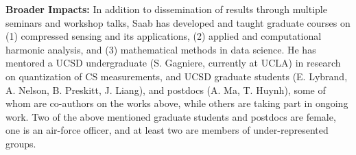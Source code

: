 \documentclass{article}
\begin{document}
 {\bf Broader Impacts: }  In addition to dissemination of results through multiple seminars and workshop talks, Saab has developed and taught graduate courses on (1) compressed sensing and its applications, (2) applied and computational harmonic analysis, and (3) mathematical methods in data science. He has  mentored a UCSD undergraduate (S. Gagniere, currently at UCLA) in research on quantization of CS measurements, and UCSD graduate students (E. Lybrand, A. Nelson, B. Preskitt, J. Liang), and postdocs (A. Ma, T. Huynh),  some of whom are co-authors on the works above, while others are taking part in ongoing work. Two of the above mentioned graduate students and postdocs are female, one is an air-force officer, and at least two are members of under-represented groups.%


\nocite{*}
{}

\end{document}
